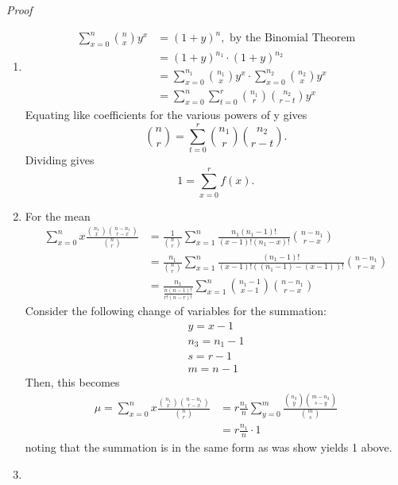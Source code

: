 \documentclass[10pt,]{book}
\makeatletter
\renewcommand*{\proofname}{Proof}
\renewenvironment{proof}[1][\proofname]{\par
  \pushQED{\qed}%
  \normalfont \topsep6\p@\@plus6\p@\relax
  \trivlist
  \item\relax
    {\itshape
    #1\@addpunct{.}}\hspace\labelsep\ignorespaces
}{%
  \popQED\endtrivlist\@endpefalse
}
\numberwithin{equation}{section}
\makeatother
\begin{document}
\begin{proof}\hypertarget{proof-38}{}
\hypertarget{p-837}{}%
\leavevmode%
\begin{enumerate}
\item\hypertarget{li-223}{}\hypertarget{p-838}{}%
%
\begin{align*}
\sum_{x=0}^n \binom{n}{x} y^x & = (1+y)^n, \text{ by the Binomial Theorem}\\
& = (1+y)^{n_1} \cdot (1+y)^{n_2} \\
& = \sum_{x=0}^{n_1} \binom{n_1}{x} y^x \cdot \sum_{x=0}^{n_2} \binom{n_2}{x} y^x \\
& = \sum_{x=0}^n \sum_{t=0}^r \binom{n_1}{r} \binom{n_2}{r-t} y^x
\end{align*}
Equating like coefficients for the various powers of y gives%
\begin{equation*}
\binom{n}{r} = \sum_{t=0}^r \binom{n_1}{r} \binom{n_2}{r-t}.
\end{equation*}
Dividing gives%
\begin{equation*}
1 = \sum_{x=0}^r f(x).
\end{equation*}
%
\item\hypertarget{li-224}{}\hypertarget{p-839}{}%
For the mean%
\begin{align*}
\sum_{x=0}^n x \frac{\binom{n_1}{x} \binom{n-n_1}{r-x}}{\binom{n}{r}} & = 
\frac{1}{\binom{n}{r}} \sum_{x=1}^n  \frac{n_1(n_1-1)!}{(x-1)!(n_1-x)!}  \binom{n-n_1}{r-x}				\\
& = \frac{n_1}{\binom{n}{r}} \sum_{x=1}^n  \frac{(n_1-1)!}{(x-1)!((n_1-1)-(x-1))!}  \binom{n-n_1}{r-x} \\
& = \frac{n_1}{\frac{n(n-1)!}{r!(n-r)!}} \sum_{x=1}^n  \binom{n_1-1}{x-1}  \binom{n-n_1}{r-x} 
\end{align*}
Consider the following change of variables for the summation:%
\begin{gather*}
y = x-1\\
n_3 = n_1-1\\
s = r-1\\
m = n-1
\end{gather*}
Then, this becomes%
\begin{align*}
\mu = \sum_{x=0}^n x \frac{\binom{n_1}{x} \binom{n-n_1}{r-x}}{\binom{n}{r}} & = r \frac{n_1}{n} \sum_{y=0}^m  \frac{\binom{n_3}{y} \binom{m-n_3}{s-y}}{\binom{m}{s}}\\
& = r \frac{n_1}{n} \cdot 1
\end{align*}
noting that the summation is in the same form as was show yields 1 above.%
\item\hypertarget{li-225}{}\hypertarget{p-840}{}%

\end{enumerate}
\end{proof}
\end{document}
